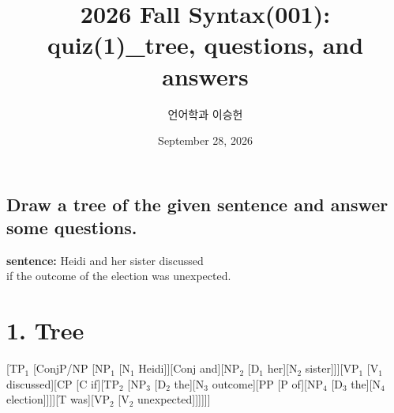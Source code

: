 \documentclass[11pt]{article}
\title{2026 Fall Syntax(001): \\ quiz(1)\_tree, questions, and answers}
\author{언어학과 이승헌}
\date{September 28, 2026}
\begin{document}
\maketitle
\thispagestyle{firstpage}
\bigskip
\begin{centering}
\section[Draw a tree of the given sentence and answer some questions.]{Draw a tree of the given sentence and answer some questions.\protect\footnotemark}
\end{centering}
\bigskip
\begin{center}
  {\large
    \textbf{sentence:} Heidi and her sister discussed\\
    if the outcome of the election was unexpected.
  }
\end{center}

\bigskip
\centering
\section{1. Tree}
\bigskip
\noindent
\begin{gpstree}{}
[TP$_1$ [ConjP/NP [NP$_1$ [N$_1$ Heidi]][Conj and][NP$_2$ [D$_1$ her][N$_2$ sister]]][VP$_1$ [V$_1$ discussed][CP [C if][TP$_2$ [NP$_3$ [D$_2$ the][N$_3$ outcome][PP [P of][NP$_4$ [D$_3$ the][N$_4$ election]]]][T was][VP$_2$ [V$_2$ unexpected]]]]]]
\end{gpstree}

\newpage
\end{document}
